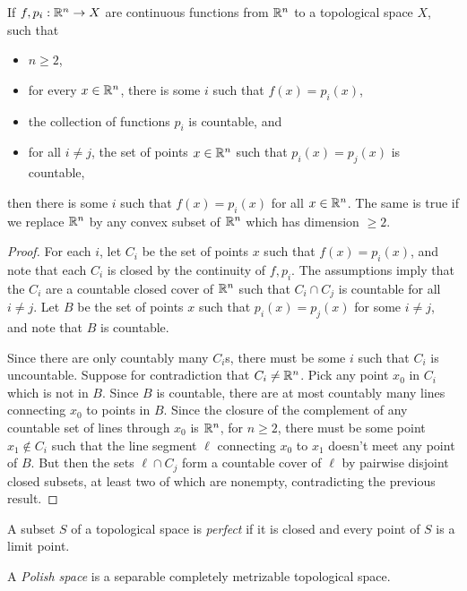 \begin{cor} If $f, p_i : \mathbb{R}^n \rightarrow X$ are continuous functions from $\mathbb{R}^n$ to a topological space $X$, such that
\begin{itemize}
\item $n \ge 2$,
\item for every $x \in \mathbb{R}^n$, there is some $i$ such that $f(x) = p_i(x)$,
\item the collection of functions $p_i$ is countable, and
\item for all $i \ne j$, the set of points $x \in \mathbb{R}^n$ such that $p_i(x) = p_j(x)$ is countable,
\end{itemize}
then there is some $i$ such that $f(x) = p_i(x)$ for all $x \in \mathbb{R}^n$. The same is true if we replace $\mathbb{R}^n$ by any convex subset of $\mathbb{R}^n$ which has dimension $\ge 2$.
\end{cor}
\begin{proof} For each $i$, let $C_i$ be the set of points $x$ such that $f(x) = p_i(x)$, and note that each $C_i$ is closed by the continuity of $f, p_i$. The assumptions imply that the $C_i$ are a countable closed cover of $\mathbb{R}^n$ such that $C_i \cap C_j$ is countable for all $i \ne j$. Let $B$ be the set of points $x$ such that $p_i(x) = p_j(x)$ for some $i \ne j$, and note that $B$ is countable.

Since there are only countably many $C_i$s, there must be some $i$ such that $C_i$ is uncountable. Suppose for contradiction that $C_i \ne \mathbb{R}^n$. Pick any point $x_0$ in $C_i$ which is not in $B$. Since $B$ is countable, there are at most countably many lines connecting $x_0$ to points in $B$. Since the closure of the complement of any countable set of lines through $x_0$ is $\mathbb{R}^n$, for $n \ge 2$, there must be some point $x_1 \not\in C_i$ such that the line segment $\ell$ connecting $x_0$ to $x_1$ doesn't meet any point of $B$. But then the sets $\ell \cap C_j$ form a countable cover of $\ell$ by pairwise disjoint closed subsets, at least two of which are nonempty, contradicting the previous result.
\end{proof}

\begin{defn} A subset $S$ of a topological space is \emph{perfect} if it is closed and every point of $S$ is a limit point.
\end{defn}

\begin{defn} A \emph{Polish space} is a separable completely metrizable topological space.
\end{defn}

